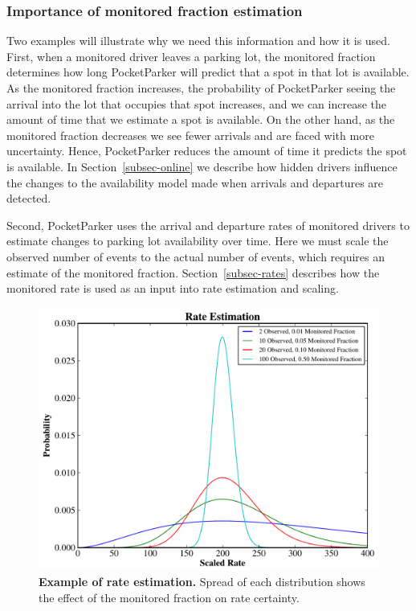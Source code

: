 \subsubsection{Importance of monitored fraction estimation}

Two examples will illustrate why we need this information and how it is used.
First, when a monitored driver leaves a parking lot, the monitored fraction
determines how long PocketParker will predict that a spot in that lot is
available. As the monitored fraction increases, the probability of
PocketParker seeing the arrival into the lot that occupies that spot
increases, and we can increase the amount of time that we estimate a spot is
available. On the other hand, as the monitored fraction decreases we see
fewer arrivals and are faced with more uncertainty. Hence, PocketParker
reduces the amount of time it predicts the spot is available. In
Section~\ref{subsec-online} we describe how hidden drivers influence the
changes to the availability model made when arrivals and departures are
detected.

Second, PocketParker uses the arrival and departure rates of monitored
drivers to estimate changes to parking lot availability over time. Here we
must scale the observed number of events to the actual number of events,
which requires an estimate of the monitored fraction.
Section~\ref{subsec-rates} describes how the monitored rate is used as an
input into rate estimation and scaling.

\begin{figure}
\centering
\includegraphics[width=\columnwidth]{./figures/rates.pdf}

\caption{\textbf{Example of rate estimation.} Spread of each distribution
shows the effect of the monitored fraction on rate certainty.}

\label{fig-rateexample}
\end{figure}

